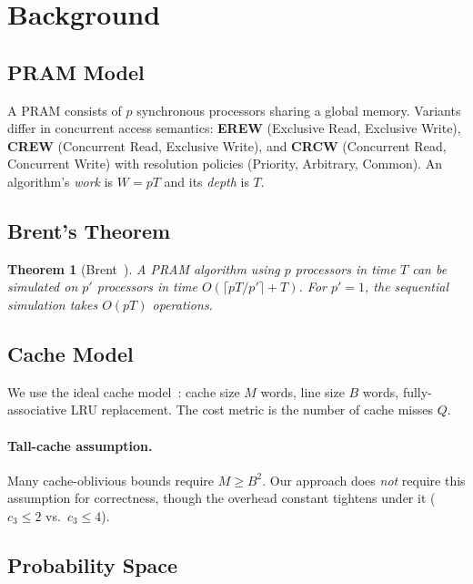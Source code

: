 \documentclass[11pt]{article}
\newtheorem{theorem}{Theorem}
\begin{document}
\section{Background}
\label{sec:background}

\subsection{PRAM Model}

A PRAM consists of $p$ synchronous processors sharing a global memory.
Variants differ in concurrent access semantics:
\textbf{EREW} (Exclusive Read, Exclusive Write),
\textbf{CREW} (Concurrent Read, Exclusive Write), and
\textbf{CRCW} (Concurrent Read, Concurrent Write) with resolution policies
(Priority, Arbitrary, Common).  An algorithm's \emph{work} is $W = pT$
and its \emph{depth} is $T$.

\subsection{Brent's Theorem}

\begin{theorem}[Brent~\cite{brent1974parallel}]
A PRAM algorithm using $p$ processors in time $T$ can be simulated on
$p'$ processors in time $O(\lceil pT/p' \rceil + T)$.  For $p' = 1$,
the sequential simulation takes $O(pT)$ operations.
\end{theorem}

\subsection{Cache Model}

We use the ideal cache model~\cite{frigo1999cache}: cache size $M$ words,
line size $B$ words, fully-associative LRU replacement.  The cost metric
is the number of cache misses $Q$.

\paragraph{Tall-cache assumption.}
Many cache-oblivious bounds require $M \ge B^2$.  Our approach does
\emph{not} require this assumption for correctness, though the overhead
constant tightens under it ($c_3 \le 2$ vs.\ $c_3 \le 4$).

\subsection{Probability Space}
\label{sec:probspace}
\end{document}
